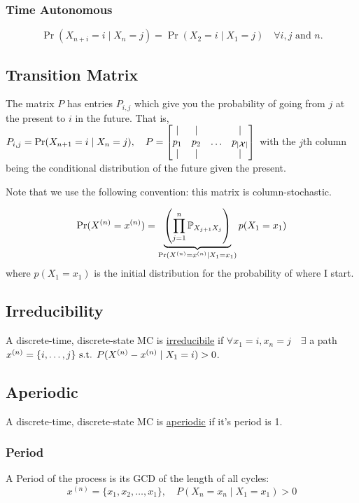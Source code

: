 \subsubsection{Time Autonomous}
\begin{equation}
\Pr\left(X_{n+i}=i \mid X_{n}=j\right)=\Pr\left(X_2=i\mid X_1=j\right) 
\quad
\forall{i, j} \text { and } n. 
\end{equation}

\subsection{Transition Matrix}
The matrix $P$ has entries $P_{i, j}$ which give you the probability of going from $j$ at the present to $i$ in the future. That is, $P_{i,j}=\Pr(X_{n+1}=i\mid X_n=j), \quad P =\begin{bmatrix}
    \mid & \mid & & \mid \\
    p_1 & p_2 & \ldots & p_{|\cX|} \\
    \mid & \mid & & \mid
\end{bmatrix}$
with the $j$th column being the conditional distribution of the future given the present.

\begin{important}
Note that we use the following convention: this matrix is column-stochastic.
\end{important}

\begin{equation}
    \Pr(X^{(n)} = x^{(n)}) = 
    \underbrace{\left(
    \prod_{j=1}^n \P_{X_{j+1} X_j}
    \right)}_{\Pr(X^{(n)} = x^{(n)} \mid X_1=x_1)}
    p(X_1=x_1)
\end{equation}
where $p(X_1=x_1)$ is the initial distribution for the probability of where I start.

\subsection{Irreducibility}
A discrete-time, discrete-state MC is \underline{irreducibile} if
$\forall x_1=i, x_n=j \quad\exists$ a path $x^{(n)} = \{i, \ldots, j\}\st P(X^{(n)} - x^{(n)} \mid X_1 = i)>0$.

\subsection{Aperiodic}
A discrete-time, discrete-state MC is \underline{aperiodic} if
it's period is 1.

\subsubsection{Period}
A Period of the process is its GCD of the length of all cycles:
$$x^{(n)}  = \{x_1,x_2,\ldots, x_1\},\quad  P(X_n=x_n \mid X_1 = x_1)>0$$


